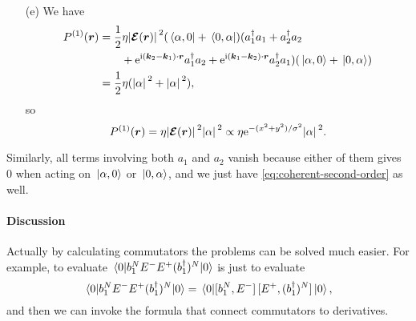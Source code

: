 \documentclass[hyperref, a4paper]{article}
\newcommand*{\ii}{\mathrm{i}}
\newcommand*{\ee}{\mathrm{e}}
\begin{document}
\begin{itemize}
\item[(e)] We have 
\[
    \begin{aligned}
        P^{(1)}(\vb*{r}) &= \frac{1}{2} \eta \abs*{\vb*{\mathcal{E}}(\vb*{r})}^2 (\bra*{\alpha, 0} + \bra*{0, \alpha}) (a_1^\dagger a_1 + a_2^\dagger a_2 \\
        &\quad \quad+ \ee^{\ii (\vb*{k}_2 - \vb*{k}_1) \cdot \vb*{r}} a_1^\dagger a_2 + \ee^{\ii (\vb*{k}_1 - \vb*{k}_2) \cdot \vb*{r}} a_2^\dagger a_1 ) (\ket*{\alpha, 0} + \ket*{0, \alpha}) \\
        &= \frac{1}{2} \eta (\abs*{\alpha}^2 + \abs*{\alpha}^2),
    \end{aligned}
\]
so 
\begin{equation}
    P^{(1)}(\vb*{r}) = \eta \abs*{\vb*{\mathcal{E}}(\vb*{r})}^2 \abs*{\alpha}^2 \propto \eta \ee^{- (x^2 + y^2) / \sigma^2} \abs*{\alpha}^2.
\end{equation}
\end{itemize}
Similarly, all terms involving both $a_1$ and $a_2$ vanish because either of them gives $0$ when acting on $\ket*{\alpha, 0}$ or $\ket*{0, \alpha}$, and we just have \eqref{eq:coherent-second-order} as well.

\paragraph{Discussion} Actually by calculating commutators the problems can be solved much easier.
For example, to evaluate $\expval*{b_1^N E^- E^+ (b_1^\dagger)^N}{0}$ is just to evaluate 
\begin{equation}
    \expval*{b_1^N E^- E^+ (b_1^\dagger)^N}{0} = \expval*{\comm*{b_1^N}{E^-} \comm*{E^+}{(b_1^\dagger)^N}}{0},
\end{equation}
and then we can invoke the formula that connect commutators to derivatives.
\end{document}
